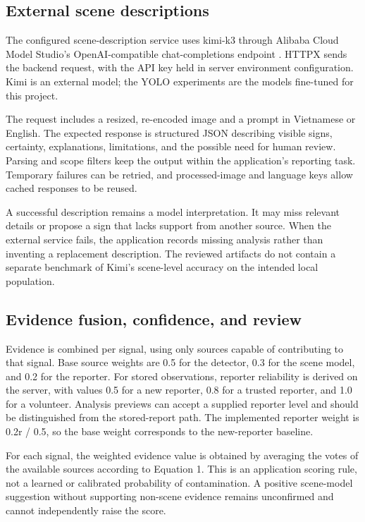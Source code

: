 \documentclass[a4paper,11pt]{article}
\begin{document}
\subsection{External scene descriptions}

The configured scene-description service uses kimi-k3 through Alibaba Cloud Model Studio's OpenAI-compatible chat-completions endpoint \cite{ref9}. HTTPX sends the backend request, with the API key held in server environment configuration. Kimi is an external model; the YOLO experiments are the models fine-tuned for this project.

The request includes a resized, re-encoded image and a prompt in Vietnamese or English. The expected response is structured JSON describing visible signs, certainty, explanations, limitations, and the possible need for human review. Parsing and scope filters keep the output within the application's reporting task. Temporary failures can be retried, and processed-image and language keys allow cached responses to be reused.

A successful description remains a model interpretation. It may miss relevant details or propose a sign that lacks support from another source. When the external service fails, the application records missing analysis rather than inventing a replacement description. The reviewed artifacts do not contain a separate benchmark of Kimi's scene-level accuracy on the intended local population.

\subsection{Evidence fusion, confidence, and review}

Evidence is combined per signal, using only sources capable of contributing to that signal. Base source weights are 0.5 for the detector, 0.3 for the scene model, and 0.2 for the reporter. For stored observations, reporter reliability is derived on the server, with values 0.5 for a new reporter, 0.8 for a trusted reporter, and 1.0 for a volunteer. Analysis previews can accept a supplied reporter level and should be distinguished from the stored-report path. The implemented reporter weight is 0.2r / 0.5, so the base weight corresponds to the new-reporter baseline.

For each signal, the weighted evidence value is obtained by averaging the votes of the available sources according to Equation 1. This is an application scoring rule, not a learned or calibrated probability of contamination. A positive scene-model suggestion without supporting non-scene evidence remains unconfirmed and cannot independently raise the score.
\end{document}
